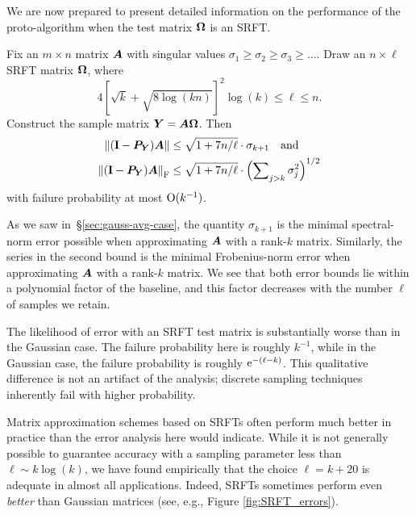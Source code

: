 \documentclass[final]{siamltex}
\newcounter{algorithm}[section]
\newcommand{\notate}[1]{\textcolor{red}{\textbf{[#1]}}}
\begin{document}
We are now prepared to present detailed information on the
performance of the proto-algorithm when the test matrix
$\bm{\Omega}$ is an SRFT.

\lsp

\begin{theorem}
\label{thm:SRFT}
Fix an $m \times n$ matrix $\bm{A}$ with singular values
$\sigma_1 \geq \sigma_2 \geq \sigma_3 \geq \dots$.
Draw an $n \times \ell$ SRFT matrix $\bm{\Omega}$, where
$$
4 \left[\sqrt{k} + \sqrt{8\log(kn)} \right]^2 \log(k) \leq \ell \leq n.
$$
Construct the sample matrix $\bm{Y} = \bm{A\Omega}$. Then
\begin{align*}
\left\Vert { (\mathbf{I}- \bm{P}_{\bm{Y}}) \bm{A} } \right\Vert
    &\leq \sqrt{1 + 7n/\ell} \cdot \sigma_{k+1}  \quad\text{and} \\
 \left\Vert { (\mathbf{I}- \bm{P}_{\bm{Y}}) \bm{A} } \right\Vert_{\mathrm{F}}
    &\leq \sqrt{1 + 7n/\ell} \cdot \left( \sum\nolimits_{j > k} \sigma_j^2 \right)^{1/2}
\end{align*}
with failure probability at most $\mathrm{O}(k^{-1})$.
\end{theorem}

\lsp


As we saw in~\S\ref{sec:gauss-avg-case},
the quantity $\sigma_{k+1}$ is the minimal spectral-norm error possible
when approximating $\bm{A}$ with a rank-$k$ matrix.
Similarly, the series in the second bound
is the minimal Frobenius-norm error when approximating $\bm{A}$
with a rank-$k$ matrix.  We see that both error bounds
lie within a polynomial factor of the baseline, and this factor decreases
with the number $\ell$ of samples we retain.

The likelihood of error with an SRFT test matrix is substantially worse than
in the Gaussian case.  The failure probability here is roughly $k^{-1}$,
while in the Gaussian case, the failure probability is roughly $\mathrm{e}^{-(\ell - k)}$.
This qualitative difference is not an artifact of the analysis; discrete sampling techniques inherently fail with higher probability.

Matrix approximation schemes based on SRFTs often perform much better in practice
than the error analysis here would indicate. While it is not generally possible
to guarantee accuracy with a sampling parameter less than $\ell \sim k \log(k)$,
we have found empirically that the choice $\ell = k+20$ is adequate
in almost all applications. Indeed, SRFTs sometimes perform even \textit{better}
than Gaussian matrices (see, e.g., Figure \ref{fig:SRFT_errors}).
\end{document}

